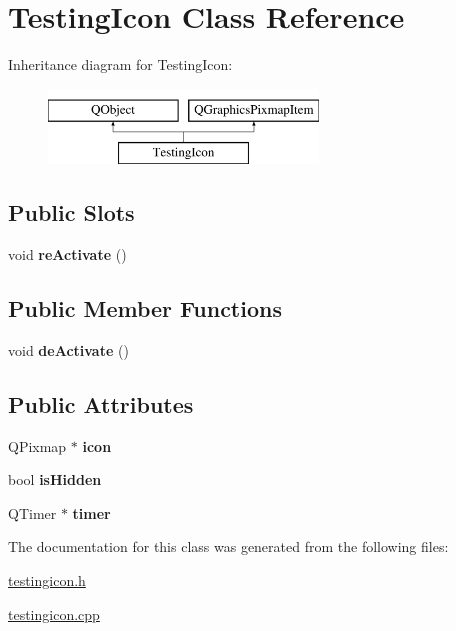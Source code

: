 \hypertarget{classTestingIcon}{\section{Testing\-Icon Class Reference}
\label{classTestingIcon}
}
Inheritance diagram for Testing\-Icon\-:\begin{figure}[H]
\begin{center}
\leavevmode
\includegraphics[height=2.000000cm]{classTestingIcon}
\end{center}
\end{figure}
\subsection*{Public Slots}
\begin{DoxyCompactItemize}
\item 
\hypertarget{classTestingIcon_a075c1421405dfeca57ce328f5fa6bd04}{void {\bfseries re\-Activate} ()}\label{classTestingIcon_a075c1421405dfeca57ce328f5fa6bd04}

\end{DoxyCompactItemize}
\subsection*{Public Member Functions}
\begin{DoxyCompactItemize}
\item 
\hypertarget{classTestingIcon_a2c069d959088b157cbcdf4d60656f426}{void {\bfseries de\-Activate} ()}\label{classTestingIcon_a2c069d959088b157cbcdf4d60656f426}

\end{DoxyCompactItemize}
\subsection*{Public Attributes}
\begin{DoxyCompactItemize}
\item 
\hypertarget{classTestingIcon_ae78a033bb145ea88596d504a8ef32d4b}{Q\-Pixmap $\ast$ {\bfseries icon}}\label{classTestingIcon_ae78a033bb145ea88596d504a8ef32d4b}

\item 
\hypertarget{classTestingIcon_a9391584daf10f909a82dd428e6641281}{bool {\bfseries is\-Hidden}}\label{classTestingIcon_a9391584daf10f909a82dd428e6641281}

\item 
\hypertarget{classTestingIcon_a5c8e56116c090b6867ca7c548e841366}{Q\-Timer $\ast$ {\bfseries timer}}\label{classTestingIcon_a5c8e56116c090b6867ca7c548e841366}

\end{DoxyCompactItemize}


The documentation for this class was generated from the following files\-:\begin{DoxyCompactItemize}
\item 
\hyperlink{testingicon_8h}{testingicon.\-h}\item 
\hyperlink{testingicon_8cpp}{testingicon.\-cpp}\end{DoxyCompactItemize}
